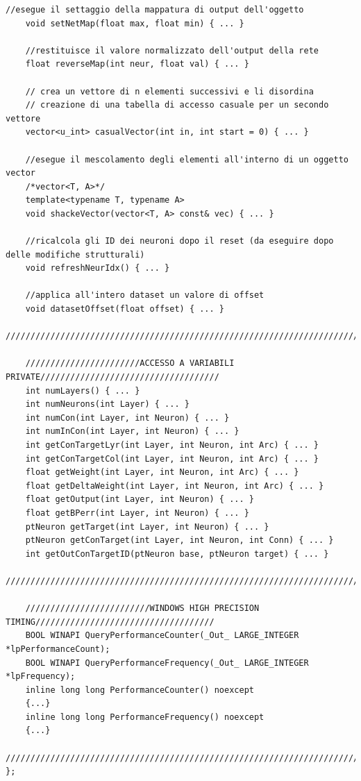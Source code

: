 \documentclass[10pt,a4paper]{article}
\begin{document}
\begin{lstlisting}[style=mycuda, caption=class Network, captionpos=b]
	//esegue il settaggio della mappatura di output dell'oggetto
	void setNetMap(float max, float min) { ... }
	
	//restituisce il valore normalizzato dell'output della rete
	float reverseMap(int neur, float val) { ... }
	
	// crea un vettore di n elementi successivi e li disordina
	// creazione di una tabella di accesso casuale per un secondo vettore
	vector<u_int> casualVector(int in, int start = 0) { ... }
		
	//esegue il mescolamento degli elementi all'interno di un oggetto vector 
	/*vector<T, A>*/
	template<typename T, typename A>
	void shackeVector(vector<T, A> const& vec) { ... }
		
	//ricalcola gli ID dei neuroni dopo il reset (da eseguire dopo delle modifiche strutturali)	
	void refreshNeurIdx() { ... }
	
	//applica all'intero dataset un valore di offset
	void datasetOffset(float offset) { ... }
	//////////////////////////////////////////////////////////////////////////////////////
	
	///////////////////////ACCESSO A VARIABILI PRIVATE////////////////////////////////////
	int numLayers() { ... }
	int numNeurons(int Layer) { ... }
	int numCon(int Layer, int Neuron) { ... }
	int numInCon(int Layer, int Neuron) { ... }
	int getConTargetLyr(int Layer, int Neuron, int Arc) { ... }
	int getConTargetCol(int Layer, int Neuron, int Arc) { ... }
	float getWeight(int Layer, int Neuron, int Arc) { ... }
	float getDeltaWeight(int Layer, int Neuron, int Arc) { ... }
	float getOutput(int Layer, int Neuron) { ... }
	float getBPerr(int Layer, int Neuron) { ... }
	ptNeuron getTarget(int Layer, int Neuron) { ... }
	ptNeuron getConTarget(int Layer, int Neuron, int Conn) { ... }
	int getOutConTargetID(ptNeuron base, ptNeuron target) { ... }
	//////////////////////////////////////////////////////////////////////////////////////
	
	/////////////////////////WINDOWS HIGH PRECISION TIMING////////////////////////////////////
	BOOL WINAPI QueryPerformanceCounter(_Out_ LARGE_INTEGER *lpPerformanceCount);
	BOOL WINAPI QueryPerformanceFrequency(_Out_ LARGE_INTEGER *lpFrequency);
	inline long long PerformanceCounter() noexcept
	{...}
	inline long long PerformanceFrequency() noexcept
	{...}
	//////////////////////////////////////////////////////////////////////////////////////
};

\end{lstlisting}
\end{document}
